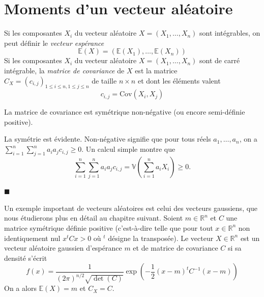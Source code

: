 \section{Moments d'un vecteur
aléatoire}\label{II-moments-dun-vecteur-aluxe9atoire}

\begin{definition}\label{II-vecteur-espuxe9rance-et-covariance}

Si les composantes \(X_i\) du vecteur aléatoire \(X = (X_1,\ldots,X_n)\)
sont intégrables, on peut définir le \emph{vecteur espérance}
\[\mathbb{E}(X) = (\mathbb{E}(X_1),\ldots,\mathbb{E}(X_n))\] Si les
composantes \(X_i\) du vecteur aléatoire \(X = (X_1,\ldots,X_n)\) sont
de carré intégrable, la \emph{matrice de covariance} de \(X\) est la
matrice \(C_X = (c_{i,j})_{1 \leq i \leq n , 1 \leq j \leq n}\) de
taille \(n \times n\) et dont les éléments valent
\[c_{i,j} = \text{Cov}(X_i,X_j)\]
\end{definition}

\begin{proposition}\label{II-matrice-de-covariance}

La matrice de covariance est symétrique non-négative (ou encore
semi-définie positive).
\end{proposition}

\begin{preuve}
La symétrie est évidente. Non-négative signifie que pour tous réels
\(a_1,\ldots,a_n\), on a
\(\sum_{i=1}^n \sum_{j=1}^n a_i a_j c_{i,j} \geq 0\). Un calcul simple
montre que
\[ \sum_{i=1}^n \sum_{j=1}^n a_i a_j c_{i,j} = \mathbb{V}(\sum_{i=1}^n a_i X_i) \geq 0.\]

\hfill$\blacksquare$
\end{preuve}

\begin{exemple}\label{II-vecteur-gaussien-n-dimensionel}

Un exemple important de vecteurs aléatoires est celui des vecteurs
gaussiens, que nous étudierons plus en détail au chapitre suivant.
Soient \(m \in \mathbb{R}^n\) et \(C\) une matrice symétrique définie
positive (c'est-à-dire telle que pour tout \(x \in \mathbb{R}^n\) non
identiquement nul \(x^tCx > 0\) où \(^t\) désigne la transposée). Le
vecteur \(X \in \mathbb{R}^n\) est un vecteur aléatoire gaussien
d'espérance \(m\) et de matrice de covariance \(C\) si sa densité
s'écrit
\[ f(x) = \frac{1}{(2\pi)^{n/2}\sqrt{\det (C)}}\exp (-\frac{1}{2}(x-m)^tC^{-1}(x-m)) \]
On a alors \(\mathbb{E}(X) = m\) et \(C_X =C\).
\end{exemple}

